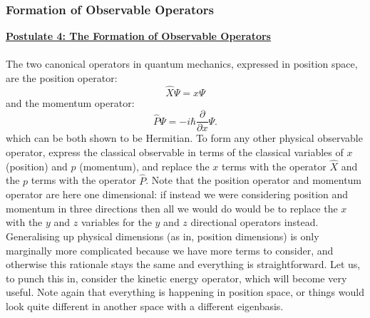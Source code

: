 \subsubsection{Formation of Observable Operators}
\Answer
\textbf{\underline{Postulate 4: The Formation of Observable Operators}}
\\\\
The two canonical operators in quantum mechanics, expressed in position space, are the position operator:
$$
\hat{X}\Psi=x\Psi
$$
and the momentum operator:
$$
\hat{P}\Psi=-i\hbar\frac{\partial}{\partial x}\Psi.
$$  
which can be both shown to be Hermitian. To form any other physical observable operator, express the classical observable in terms of the classical variables of $x$ (position) and $p$ (momentum), and replace the $x$ terms with the operator $\hat{X}$ and the $p$ terms with the operator $\hat{P}$. 
\Answerend
Note that the position operator and momentum operator are here one dimensional: if instead we were considering position and momentum in three directions then all we would do would be to replace the $x$ with the $y$ and $z$ variables for the $y$ and $z$ directional operators instead. Generalising up physical dimensions (as in, position dimensions) is only marginally more complicated because we have more terms to consider, and otherwise this rationale stays the same and everything is straightforward. Let us, to punch this in, consider the kinetic energy operator, which will become very useful. Note again that everything is happening in position space, or things would look quite different in another space with a different eigenbasis.

